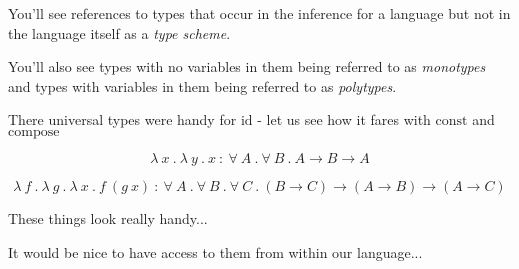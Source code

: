 \begin{frame}
  You'll see references to types that occur in the inference for a language but
  not in the language itself as a {\it type scheme}.
\end{frame}

\begin{frame}
  You'll also see types with no variables in them being referred to as {\it
    monotypes} and types with variables in them being referred to as {\it
    polytypes}.
\end{frame}

\begin{frame}
  There universal types were handy for ${\text{id}}$ - let us see how it fares with $\text{const}$
  and $\text{compose}$
\end{frame}

\begin{frame}
  \[
    \lambda~x~.~\lambda~y~.~x~{:}~\forall~A~.~\forall~B~.~A \rightarrow B \rightarrow A
  \]
\end{frame}

\begin{frame}
  \[
    \lambda~f~.~\lambda~g~.~\lambda~x~.~f~\left( g~x \right)~{:}~\forall~A~.~\forall~B~.~\forall~C~.~\left( B
      \rightarrow C \right) \rightarrow \left( A \rightarrow B \right)
    \rightarrow \left( A \rightarrow C \right)
  \]
\end{frame}

\begin{frame}
  These things look really handy...
\end{frame}

\begin{frame}
  It would be nice to have access to them from within our language...
\end{frame}

